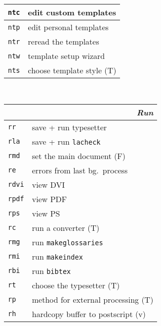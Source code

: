 \documentclass[oneside,10pt,landscape,DIV16]{scrartcl}
\newcommand{\Map}[1] {\textbf{\textasciiacute}\texttt{#1}}
\begin{document}
\begin{multicols}{3}
\begin{center}
\begin{tabular}[]{|p{11mm}|p{60mm}|}
\hline \Map{ntc} & edit custom templates     \\
\hline \Map{ntp} & edit personal templates   \\
\hline \Map{ntr} & reread the templates      \\
\hline \Map{ntw} & template setup wizard     \\
\hline \Map{nts} & choose template style     \hfill (T)\\
\hline
%
\end{tabular}\\
%
\begin{tabular}[]{|p{11mm}|p{62mm}|}
\hline
\multicolumn{2}{|r|}{\textsl{\textbf{R}un}} \\[1.0ex]
\hline \Map{rr}   & save + run typesetter                    \\
\hline \Map{rla}  & save + run \texttt{lacheck}              \\
\hline \Map{rmd}  & set the main document                    \hfill (F)\\
\hline \Map{re}   & errors from last bg.\ process            \\
\hline \Map{rdvi} & view DVI                                 \\
\hline \Map{rpdf} & view PDF                                 \\
\hline \Map{rps}  & view PS                                  \\
\hline \Map{rc}   & run a converter                          \hfill (T)\\
\hline
\hline \Map{rmg}  & run \texttt{makeglossaries}              \\
\hline \Map{rmi}  & run \texttt{makeindex}                   \\
\hline \Map{rbi}  & run \texttt{bibtex}                      \\
\hline
\hline \Map{rt}   & choose the typesetter                    \hfill (T)\\
\hline \Map{rp}   & method for external processing           \hfill (T)\\
\hline
\hline \Map{rh}   & hardcopy buffer to postscript            \hfill (v)\\

\end{tabular}
\end{center}
\end{multicols}
\end{document}
